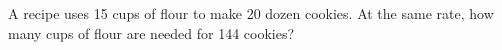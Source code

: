 A recipe uses 15 cups of flour to make 20 dozen cookies. At the same rate, how many cups of flour are needed for 144 cookies?
